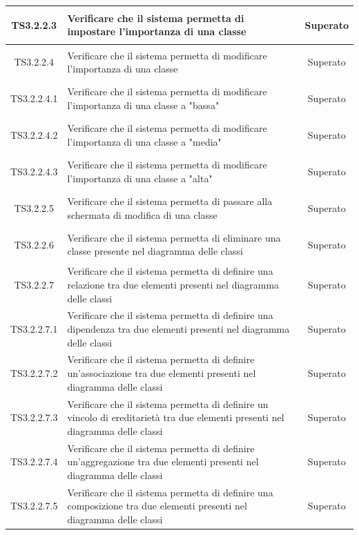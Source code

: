 \documentclass[../PianoDiQualifica.tex]{subfiles}
\begin{document}
\begin{longtable}{|c|>{\centering}p{10cm}|c|}
	\hline
	\hypertarget{TS3.2.2.3}{TS3.2.2.3} & Verificare che il sistema permetta di impostare l'importanza di una classe & Superato \\
	\hline
	\hypertarget{TS3.2.2.4}{TS3.2.2.4} & Verificare che il sistema permetta di modificare l'importanza di una classe & Superato \\
	\hline
	\hypertarget{TS3.2.2.4.1}{TS3.2.2.4.1} & Verificare che il sistema permetta di modificare l'importanza di una classe a "bassa" & Superato \\
	\hline
	\hypertarget{TS3.2.2.4.2}{TS3.2.2.4.2} & Verificare che il sistema permetta di modificare l'importanza di una classe a "media" & Superato \\
	\hline
	\hypertarget{TS3.2.2.4.3}{TS3.2.2.4.3} & Verificare che il sistema permetta di modificare l'importanza di una classe a "alta" & Superato \\
	\hline
	\hypertarget{TS3.2.2.5}{TS3.2.2.5} & Verificare che il sistema permetta di passare alla schermata di modifica di una classe & Superato \\
	\hline
	\hypertarget{TS3.2.2.6}{TS3.2.2.6} & Verificare che il sistema permetta di eliminare una classe presente nel diagramma delle classi & Superato \\
	\hline
	\hypertarget{TS3.2.2.7}{TS3.2.2.7} & Verificare che il sistema permetta di definire una relazione tra due elementi presenti nel diagramma delle classi & Superato \\
	\hline
	\hypertarget{TS3.2.2.7.1}{TS3.2.2.7.1} & Verificare che il sistema permetta di definire una dipendenza tra due elementi presenti nel diagramma delle classi & Superato \\
	\hline
	\hypertarget{TS3.2.2.7.2}{TS3.2.2.7.2} & Verificare che il sistema permetta di definire un'associazione tra due elementi presenti nel diagramma delle classi & Superato\\
	\hline
	\hypertarget{TS3.2.2.7.3}{TS3.2.2.7.3} & Verificare che il sistema permetta di definire un vincolo di ereditarietà tra due elementi presenti nel diagramma delle classi & Superato \\
	\hline
	\hypertarget{TS3.2.2.7.4}{TS3.2.2.7.4} & Verificare che il sistema permetta di definire un'aggregazione tra due elementi presenti nel diagramma delle classi & Superato \\
	\hline
	\hypertarget{TS3.2.2.7.5}{TS3.2.2.7.5} & Verificare che il sistema permetta di definire una composizione tra due elementi presenti nel diagramma delle classi & Superato \\

\end{longtable}
\end{document}
